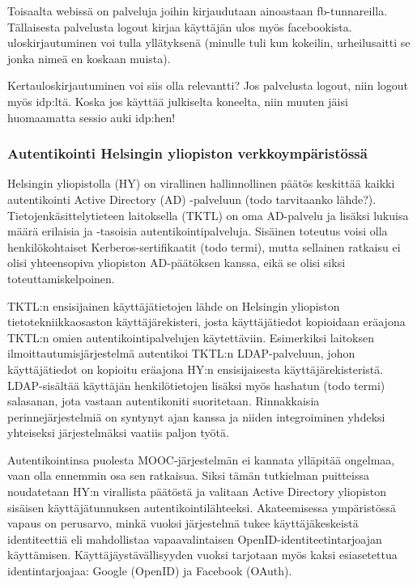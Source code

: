 \documentclass[finnish,gradu]{tktltiki}
\begin{document}
  Toisaalta webissä on palveluja joihin kirjaudutaan ainoastaan fb-tunnareilla. Tällaisesta palvelusta logout kirjaa käyttäjän ulos myös facebookista. uloskirjautuminen voi tulla yllätyksenä (minulle tuli kun kokeilin, urheilusaitti se jonka nimeä en koskaan muista).

  Kertauloskirjautuminen voi siis olla relevantti? Jos palvelusta logout, niin logout myös idp:ltä. Koska jos käyttää julkiselta koneelta, niin muuten jäisi huomaamatta sessio auki idp:hen!

  \subsubsection{Autentikointi Helsingin yliopiston verkkoympäristössä} %
  \label{sub:autentikointi_helsingin_yliopiston_verkkoympäristössä}

  Helsingin yliopistolla (HY) on virallinen hallinnollinen päätös keskittää kaikki autentikointi Active Directory (AD) -palveluun (todo tarvitaanko lähde?).
  Tietojenkäsittelytieteen laitoksella (TKTL) on oma AD-palvelu ja lisäksi lukuisa määrä erilaisia ja -tasoisia autentikointipalveluja.
  Sisäinen toteutus voisi olla henkilökohtaiset Kerberos-sertifikaatit (todo termi), mutta sellainen ratkaisu ei olisi yhteensopiva yliopiston AD-päätöksen kanssa, eikä se olisi siksi toteuttamiskelpoinen.

  TKTL:n ensisijainen käyttäjätietojen lähde on Helsingin yliopiston tietotekniikkaosaston käyttäjärekisteri, josta käyttäjätiedot kopioidaan eräajona TKTL:n omien autentikointipalvelujen käytettäviin. Esimerkiksi laitoksen ilmoittautumisjärjestelmä autentikoi TKTL:n LDAP-palveluun, johon käyttäjätiedot on kopioitu eräajona HY:n ensisijaisesta käyttäjärekisteristä. LDAP-sisältää käyttäjän henkilötietojen lisäksi myös hashatun (todo termi) salasanan, jota vastaan autentikoniti suoritetaan. Rinnakkaisia perinnejärjestelmiä on syntynyt ajan kanssa ja niiden integroiminen yhdeksi yhteiseksi järjestelmäksi vaatiis paljon työtä.

  Autentikointinsa puolesta MOOC-järjestelmän ei kannata ylläpitää ongelmaa, vaan olla ennemmin osa sen ratkaisua. Siksi tämän tutkielman puitteissa noudatetaan HY:n virallista päätöstä ja valitaan Active Directory yliopiston sisäisen käyttäjätunnuksen autentikointilähteeksi. Akateemisessa ympäristössä vapaus on perusarvo, minkä vuoksi järjestelmä tukee käyttäjäkeskeistä identiteettiä eli mahdollistaa vapaavalintaisen OpenID-identiteetintarjoajan käyttämisen. Käyttäjäystävällisyyden vuoksi tarjotaan myös kaksi esiasetettua identintarjoajaa: Google (OpenID) ja Facebook (OAuth).
\end{document}
